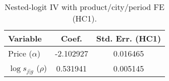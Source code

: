 \begin{table}[H]
\centering
\caption{Nested-logit IV with product/city/period FE (HC1).}
\begin{tabular}{lcc}
\toprule
Variable & Coef. & Std. Err. (HC1) \\
\midrule
Price ($\alpha$) & -2.102927 & 0.016465 \\
$\log s_{j|g}$ ($\rho$) & 0.531941 & 0.005145 \\
\bottomrule
\end{tabular}
\label{tab:q20_nl_ivfe}
\end{table}
